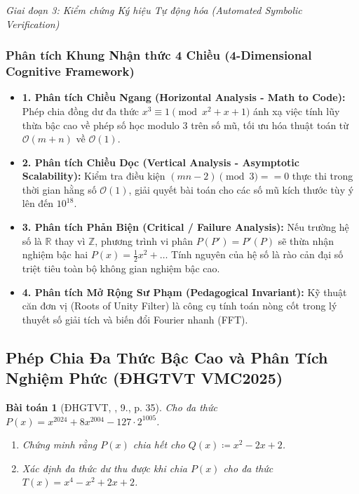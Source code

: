 \documentclass{article}
\newtheorem{baitoan}{Bài toán}
\begin{document}
\vspace{0.5em}\noindent\emph{Giai đoạn 3: Kiểm chứng Ký hiệu Tự động hóa (Automated Symbolic Verification)}


\subsubsection*{Phân tích Khung Nhận thức 4 Chiều (4-Dimensional Cognitive Framework)}
\begin{itemize}
    \item \textbf{1. Phân tích Chiều Ngang (Horizontal Analysis - Math to Code):} Phép chia đồng dư đa thức $x^3 \equiv 1 \pmod{x^2+x+1}$ ánh xạ việc tính lũy thừa bậc cao về phép số học modulo 3 trên số mũ, tối ưu hóa thuật toán từ $\mathcal{O}(m+n)$ về $\mathcal{O}(1)$.
    \item \textbf{2. Phân tích Chiều Dọc (Vertical Analysis - Asymptotic Scalability):} Kiểm tra điều kiện $(mn - 2) \pmod 3 == 0$ thực thi trong thời gian hằng số $\mathcal{O}(1)$, giải quyết bài toán cho các số mũ kích thước tùy ý lên đến $10^{18}$.
    \item \textbf{3. Phân tích Phản Biện (Critical / Failure Analysis):} Nếu trường hệ số là $\mathbb{R}$ thay vì $\mathbb{Z}$, phương trình vi phân $P(P') = P'(P)$ sẽ thừa nhận nghiệm bậc hai $P(x) = \frac{1}{2}x^2 + \dots$ Tính nguyên của hệ số là rào cản đại số triệt tiêu toàn bộ không gian nghiệm bậc cao.
    \item \textbf{4. Phân tích Mở Rộng Sư Phạm (Pedagogical Invariant):} Kỹ thuật căn đơn vị (Roots of Unity Filter) là công cụ tính toán nòng cốt trong lý thuyết số giải tích và biến đổi Fourier nhanh (FFT).
\end{itemize}

\subsection{Phép Chia Đa Thức Bậc Cao và Phân Tích Nghiệm Phức (ĐHGTVT VMC2025)}

\begin{baitoan}[ĐHGTVT, \cite{VMS_VMC2025}, 9., p. 35]
Cho đa thức $P(x) = x^{2024} + 8x^{2004} - 127\cdot 2^{1005}$.
\begin{enumerate}
    \item[(a)] Chứng minh rằng $P(x)$ chia hết cho $Q(x) \coloneqq x^2 - 2x + 2$.
    \item[(b)] Xác định đa thức dư thu được khi chia $P(x)$ cho đa thức $T(x) = x^4 - x^2 + 2x + 2$.
\end{enumerate}
\end{baitoan}
\end{document}
